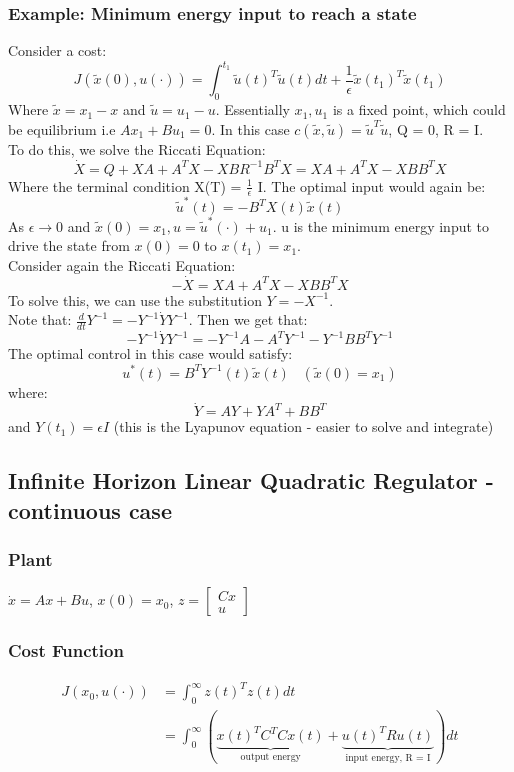 \documentclass{article}
\begin{document}
\subsubsection*{Example: Minimum energy input to reach a state}
Consider a cost:
\[
J(\tilde{x}(0),u(\cdot)) = \int_0^{t_1} \tilde u(t)^T \tilde u(t) dt + \frac{1}{\epsilon} \tilde x(t_1)^T \tilde x(t_1)
\]
Where $\tilde x = x_1 - x$ and $\tilde u = u_1 - u$. Essentially $x_1,u_1$ is a fixed point, which could be equilibrium i.e $Ax_1 + B u_1 = 0$. In this case $c(\tilde x, \tilde u) = \tilde u^T \tilde u$, Q = 0, R = I. \\
To do this, we solve the Riccati Equation: 
\[
\dot X = Q + XA +A^T X - XBR^{-1}B^T X = XA + A^T X - XBB^TX 
\]
Where the terminal condition X(T) = $\frac{1}{\epsilon}$ I. The optimal input would again be:
\[
\tilde u^*(t) = -B^T X(t) \tilde x(t)
\]
As $\epsilon \rightarrow 0$ and $\tilde x(0) = x_1, u = \tilde u^*(\cdot) + u_1$. u is the minimum energy input to drive the state from $x(0) = 0$ to $x(t_1) = x_1$. \\
Consider again the Riccati Equation:
\[
-\dot X = XA + A^TX - XBB^T X
\]
To solve this, we can use the substitution $Y = -X^{-1}$. \\ Note that: $\frac{d}{dt} Y^{-1} = - Y^{-1} \dot Y Y^{-1}$. Then we get that:
\[
-Y^{-1}\dot Y Y^{-1} = -Y^{-1}A - A^T Y^{-1} - Y^{-1}BB^T Y^{-1}
\]
The optimal control in this case would satisfy:
\[
u^*(t) = B^TY^{-1}(t) \tilde x(t) \; \; \; (\tilde x(0) = x_1)
\]
where:
\[
\dot Y = AY + YA^T + BB^T
\]
and $Y(t_1) = \epsilon I$ (this is the Lyapunov equation - easier to solve and integrate)
\subsection{Infinite Horizon Linear Quadratic Regulator - continuous case}
\subsubsection*{Plant}
$\dot x = Ax + Bu$, $x(0) = x_0$, $z = \begin{bmatrix}
    Cx \\ u
\end{bmatrix}$
\subsubsection*{Cost Function}
\[
\begin{aligned}
    J(x_0,u(\cdot)) &= \int_0^\infty z(t)^T z(t) dt \\
    &= \int_0^\infty \left( \underbrace{x(t)^T C^T C x(t)}_{\text{output energy}} 
    + \underbrace{u(t)^T R u(t)}_{\text{input energy, R = I}} \right) dt
\end{aligned}
\]
\end{document}
